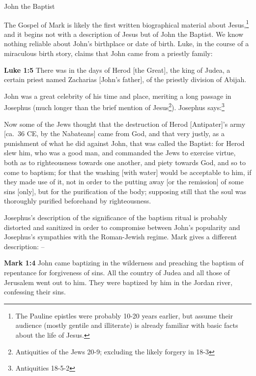 \documentclass[10pt,twoside]{article} %
\newcommand{\quotesize}{\normalsize{}}
\newcommand{\comm}[1]{\begingroup \color{black!50} #1\endgroup}
\newenvironment{quotetext}{\begingroup\quotesize}{\endgroup}
\newcommand{\intex}[1]{\index[texts]{#1}}
\newcommand{\bible}[2]{\begin{quotetext}\textbf{#1}\intex{#1} #2\end{quotetext}}
\newcommand{\gospelmark}[2]{\bible{Mark #1}{#2}}
\newcommand{\luke}[2]{\bible{Luke #1}{#2}}
\begin{document}
\begin{section}{John the Baptist}

\comm{The Gospel of Mark is likely the first written biographical material about Jesus,\footnote{The Pauline epistles were probably 10-20 years
earlier, but assume their audience (mostly gentile and illiterate) is already familiar with basic facts about the life of Jesus.}
and it begins not with a description of Jesus but of John the Baptist.
We know nothing reliable about John's birthplace or date of birth. Luke, in the course of a miraculous birth story, claims that
John came from a priestly family:}



\luke{1:5}{There was in the days of Herod [the Great], the king of Judea, a certain priest named Zacharias [John's father], of the priestly division of Abijah.}

\comm{
John was a great celebrity of his time and place, meriting a long passage in
Josephus (much longer than the brief mention of Jesus\footnote{Antiquities of the Jews 20-9;
excluding the likely forgery in 18-3}).
Josephus says:\footnote{Antiquities 18-5-2} %
}

\begin{quotetext}\label{josephus-baptism}
Now some of the Jews thought that the destruction of Herod [Antipater]'s army [ca.~36 CE, by the Nabateans] came
from God, and that very justly, as a punishment of what he did against
John, that was called the Baptist: for Herod slew him, who was a good
man, and commanded the Jews to exercise virtue, both as to
righteousness towards one another, and piety towards God, and so to
come to baptism; for that the washing [with water] would be acceptable
to him, if they made use of it, not in order to the putting away [or
the remission] of some sins [only], but for the purification of the
body; supposing still that the soul was thoroughly purified beforehand
by righteousness.
\end{quotetext}

\comm{
Josephus's description of the significance of the baptism ritual is probably
distorted and sanitized in order to compromise between John's popularity and Josephus's sympathies
with the Roman-Jewish regime. Mark gives a different description: --
}

\gospelmark{1:4}{John came baptizing in the wilderness and preaching the
baptism of repentance for forgiveness of sins.  All the country of
Judea and all those of Jerusalem went out to him. They were baptized
by him in the Jordan river, confessing their sins.}


\end{section}
\end{document}

